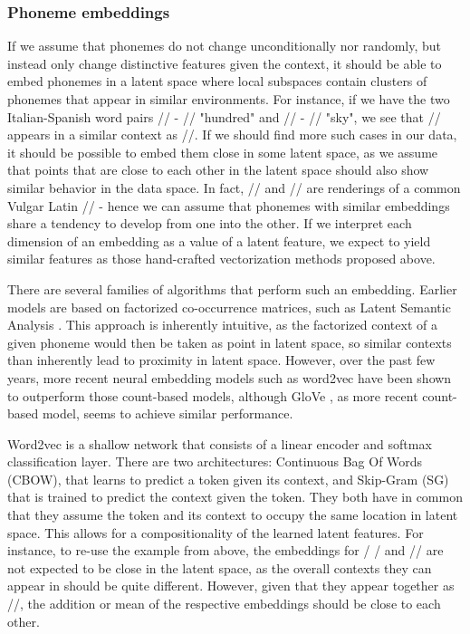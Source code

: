 \documentclass[6pt]{article}
\begin{document}
\subsubsection{Phoneme embeddings}
\label{Phoneme embeddings}



If we assume that phonemes do not change unconditionally nor randomly, but instead only change distinctive features given the context, it should be able to embed phonemes in a latent space where local subspaces contain clusters of phonemes that appear in similar environments. For instance, if we have the two Italian-Spanish word pairs // - // "hundred" and  // - // "sky", we see that // appears in a similar context as //. If we should find more such cases in our data, it should be possible to embed them close in some latent space, as we assume that points that are close to each other in the latent space should also show similar behavior in the data space. In fact, // and // are renderings of a common Vulgar Latin // - hence we can assume that phonemes with similar embeddings share a tendency to develop from one into the other. If we interpret each dimension of an embedding as a value of a latent feature, we expect to yield similar features as those hand-crafted vectorization methods proposed above.



There are several families of algorithms that perform such an embedding. Earlier models are based on factorized co-occurrence matrices, such as Latent Semantic Analysis \citep{landauer2013handbook}. This approach is inherently intuitive, as the factorized context of a given phoneme would then be taken as point in latent space, so similar contexts than inherently lead to proximity in latent space. However, over the past few years, more recent neural embedding models such as word2vec \citep{mikolov2013efficient,mikolov2013distributed,goldberg2014word2vec}  have been shown to outperform those count-based models, although GloVe \citep{pennington2014glove}, as more recent count-based model, seems to achieve similar performance.

Word2vec is a shallow network that consists of a linear encoder and softmax classification layer. There are two architectures: Continuous Bag Of Words (CBOW), that learns to predict a token given its context, and Skip-Gram (SG) that is trained to predict the context given the token. They both have in common that they assume the token and its context to occupy the same location in latent space. This allows for a compositionality of the learned latent features. For instance, to re-use the example from above, the embeddings for / / and // are not expected to be close in the latent space, as the overall contexts they can appear in should be quite different. However, given that they appear together as //, the addition or mean of the respective embeddings should be close to each other.
\end{document}
